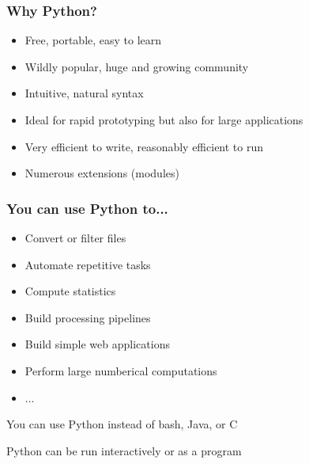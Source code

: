 \documentclass[10pt]{beamer}
\begin{document}
\begin{frame}
\frametitle{Why Python?}

\begin{itemize}
\item Free, portable, easy to learn
\item Wildly popular, huge and growing community
\item Intuitive, natural syntax
\item Ideal for rapid prototyping but also for large applications
\item Very efficient to write, reasonably efficient to run
\item Numerous extensions (modules)
\end{itemize}
\end{frame}

\begin{frame}
\frametitle{You can use Python to...}
\begin{itemize}
\item Convert or filter files
\item Automate repetitive tasks
\item Compute statistics
\item Build processing pipelines
\item Build simple web applications
\item Perform large numberical computations
\item ...
\end{itemize}

You can use Python instead of bash, Java, or C
\vspace{2mm}

Python can be run interactively or as a program
\end{frame}
\end{document}
